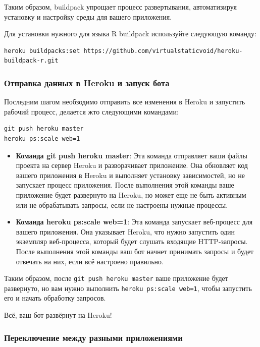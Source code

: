 \documentclass[
]{book}
\begin{document}
Таким образом, buildpack упрощает процесс развертывания, автоматизируя установку и настройку среды для вашего приложения.

Для установки нужного для языка R buildpack используйте следующую команду:

\begin{verbatim}
heroku buildpacks:set https://github.com/virtualstaticvoid/heroku-buildpack-r.git
\end{verbatim}

\subsubsection{Отправка данных в Heroku и запуск бота}\label{ux43eux442ux43fux440ux430ux432ux43aux430-ux434ux430ux43dux43dux44bux445-ux432-heroku-ux438-ux437ux430ux43fux443ux441ux43a-ux431ux43eux442ux430}

Последним шагом необзодимо отправить все изменения в Heroku и запустить рабочий процесс, делается жто следующими командами:

\begin{verbatim}
git push heroku master
heroku ps:scale web=1
\end{verbatim}

\begin{itemize}
\item
  \textbf{Команда git push heroku master}: Эта команда отправляет ваши файлы проекта на сервер Heroku и разворачивает приложение.
  Она обновляет код вашего приложения в Heroku и выполняет установку зависимостей, но не запускает процесс приложения.
  После выполнения этой команды ваше приложение будет развернуто на Heroku, но может еще не быть активным или не обрабатывать запросы, если не настроены нужные процессы.
\item
  \textbf{Команда heroku ps:scale web=1}: Эта команда запускает веб-процесс для вашего приложения.
  Она указывает Heroku, что нужно запустить один экземпляр веб-процесса, который будет слушать входящие HTTP-запросы.
  После выполнения этой команды ваш бот начнет принимать запросы и будет отвечать на них, если всё настроено правильно.
\end{itemize}

Таким образом, после \texttt{git\ push\ heroku\ master} ваше приложение будет развернуто, но вам нужно выполнить \texttt{heroku\ ps:scale\ web=1}, чтобы запустить его и начать обработку запросов.

Всё, ваш бот развёрнут на Heroku!

\subsubsection{Переключение между разными приложениями}\label{ux43fux435ux440ux435ux43aux43bux44eux447ux435ux43dux438ux435-ux43cux435ux436ux434ux443-ux440ux430ux437ux43dux44bux43cux438-ux43fux440ux438ux43bux43eux436ux435ux43dux438ux44fux43cux438}
\end{document}
